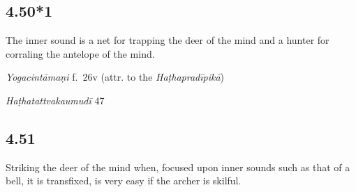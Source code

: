 \begin{ekdosis}
\subsection*{4.50*1}
\begin{translation}[hp04_050_1]
The inner sound is a net for trapping the deer of the mind and a hunter for corraling the antelope of the mind.
\end{translation}


\begin{testimonia}[hp04_050_1]
\emph{Yogacintāmaṇi} f.~26v (attr. to the \emph{Haṭhapradīpikā})
\begin{versinnote}
\end{versinnote}

\emph{Haṭhatattvakaumudī} 47
\begin{versinnote}
\end{versinnote}
\end{testimonia}

\begin{philcomm}[hp04_050_1]
%
\end{philcomm}



\subsection*{4.51}
\begin{translation}[hp04_051]
Striking the deer of the mind when, focused upon inner sounds such as that of a bell, it is transfixed, is very easy if the archer is skilful.
\end{translation}


\end{ekdosis}
